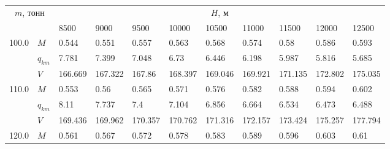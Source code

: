 \begin{tabular}{|l|l|lllllllll|}\hline
\multicolumn{2}{|c|}{$m$, тонн}& \multicolumn{9}{c|}{$H$, м}\\ 
 \cline{3-11}
 \multicolumn{2}{|c|}{}&                      8500 &                      9000 &                      9500 &                     10000 &                     10500 &                     11000 &                     11500 &                     12000 &                     12500 \\
\hline
100.0 & $M$ &                     0.544 &                     0.551 &                     0.557 &                     0.563 &                     0.568 &                     0.574 &                      0.58 &                     0.586 &    0.593\cellcolor{green} \\
      & $q_{km}$ &                     7.781 &                     7.399 &                     7.048 &                      6.73 &                     6.446 &                     6.198 &                     5.987 &                     5.816 &    5.685\cellcolor{green} \\
      & $V$ &                   166.669 &                   167.322 &                    167.86 &                   168.397 &                   169.046 &                   169.921 &                   171.135 &                   172.802 &  175.035\cellcolor{green} \\
\hline
110.0 & $M$ &                     0.553 &                      0.56 &                     0.565 &                     0.571 &                     0.576 &                     0.582 &                     0.588 &    0.594\cellcolor{green} &                     0.602 \\
      & $q_{km}$ &                      8.11 &                     7.737 &                       7.4 &                     7.104 &                     6.856 &                     6.664 &                     6.534 &    6.473\cellcolor{green} &                     6.488 \\
      & $V$ &                   169.436 &                   169.962 &                   170.357 &                   170.762 &                   171.316 &                   172.157 &                   173.424 &  175.257\cellcolor{green} &                   177.794 \\
\hline
120.0 & $M$ &                     0.561 &                     0.567 &                     0.572 &                     0.578 &                     0.583 &                     0.589 &    0.596\cellcolor{green} &                     0.603 &                      0.61 \\

\end{tabular}
